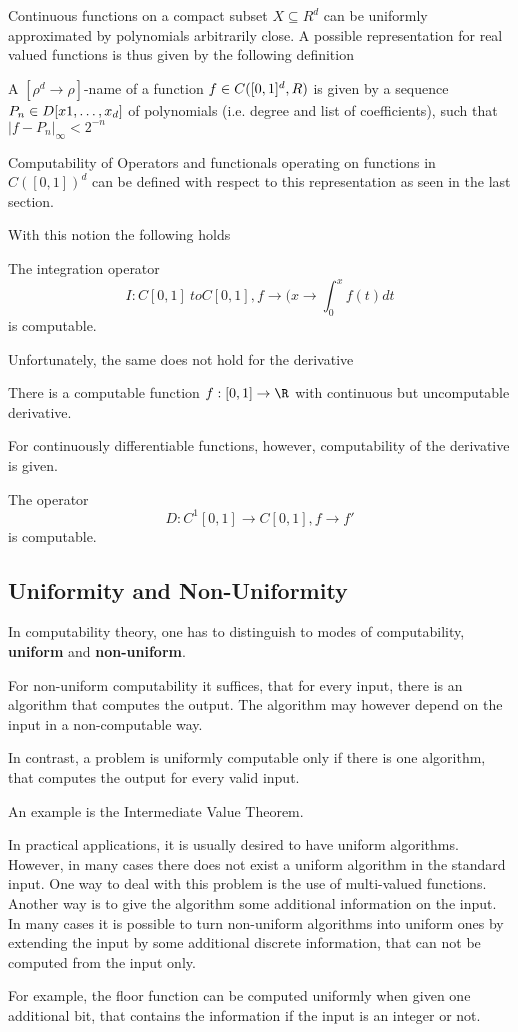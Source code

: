 Continuous functions on a compact subset $X \subseteq R^d$ can be uniformly approximated by polynomials arbitrarily close.
A possible representation for real valued functions is thus given by the following definition 
\begin{definition}
A $[\rho^d \to \rho]$-name of a function $f \in C([0,1]^d, \\R)$ is given by a
sequence $P_n \in \\D[x1, \dots, x_d]$ of polynomials (i.e. degree and list of
coefficients), such that $\vert f - P_n \vert_\infty < 2^{-n}$
\end{definition}
Computability of Operators and functionals operating on functions in
$C([0,1])^d$ can be defined with respect to this representation as seen in the
last section.

With this notion the following holds
\begin{theorem}
The integration operator 
$$I: C[0,1] \ to C[0,1], f \to (x \to \int_0^x f(t) dt$$   
is computable.
\end{theorem}
Unfortunately, the same does not hold for the derivative
\begin{theorem}[Myhill 1971]
There is a computable function $f: [0,1] \to \R$ with continuous but uncomputable derivative. 
\end{theorem}
For continuously differentiable functions, however, computability of the
derivative is given. 
\begin{theorem}
The operator 
$$ D: C^1[0,1] \to C[0,1], f \to f'$$
is computable.
\end{theorem}
\subsection{Uniformity and Non-Uniformity}
In computability theory, one has to distinguish to modes of computability, \textbf{uniform} and \textbf{non-uniform}.

For non-uniform computability it suffices, that for every input, there is an algorithm that computes the output. 
The algorithm may however depend on the input in a non-computable way.

In contrast, a problem is uniformly computable only if there is one algorithm, that computes the output for every valid input. 

An example is the Intermediate Value Theorem.

In practical applications, it is usually desired to have uniform algorithms.
However, in many cases there does not exist a uniform algorithm in the standard
input.
One way to deal with this problem is the use of multi-valued functions.
Another way is to give the algorithm some additional information on the input.
In many cases it is possible to turn non-uniform algorithms into uniform ones
by extending the input by some additional discrete information, that can not be
computed from the input only.

For example, the floor function can be computed uniformly when given one
additional bit, that contains the information if the input is an integer or
not.  
